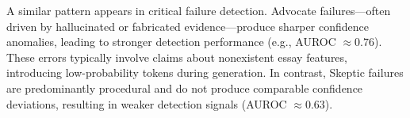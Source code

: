 \documentclass[11pt]{article}
\begin{document}
A similar pattern appears in critical failure detection. Advocate failures—often driven by hallucinated or fabricated evidence—produce sharper confidence anomalies, leading to stronger detection performance (e.g., AUROC $\approx 0.76$). These errors typically involve claims about nonexistent essay features, introducing low-probability tokens during generation. In contrast, Skeptic failures are predominantly procedural and do not produce comparable confidence deviations, resulting in weaker detection signals (AUROC $\approx 0.63$).

\end{document}
